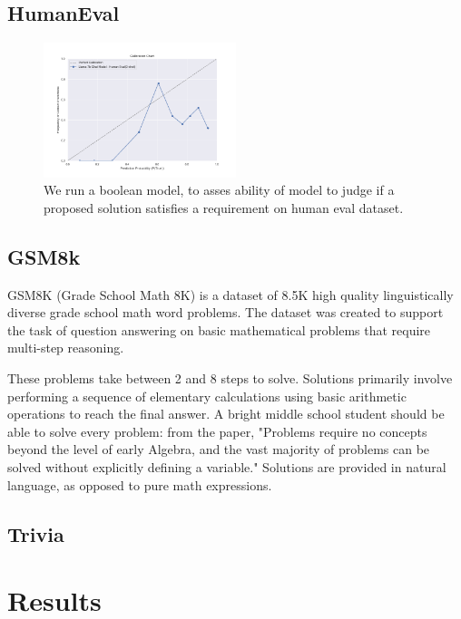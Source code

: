 \documentclass[11pt]{article}
\begin{document}
\subsection{HumanEval}

\begin{figure}
  \includegraphics[width=0.5\textwidth]{figures/0-shot-7b-human-eval.png}
  \caption{We run a boolean model, to asses ability of model to judge if a proposed solution satisfies a requirement on human eval dataset.}
  \label{fig:human-eval-results}
\end{figure}

\subsection{GSM8k}

GSM8K (Grade School Math 8K) is a dataset of 8.5K high quality linguistically diverse grade school math word problems. The dataset was created to support the task of question answering on basic mathematical problems that require multi-step reasoning.

These problems take between 2 and 8 steps to solve. Solutions primarily involve performing a sequence of elementary calculations using basic arithmetic operations  to reach the final answer. A bright middle school student should be able to solve every problem: from the paper, "Problems require no concepts beyond the level of early Algebra, and the vast majority of problems can be solved without explicitly defining a variable." Solutions are provided in natural language, as opposed to pure math expressions. 

\subsection{Trivia}


\section{Results}
\end{document}
